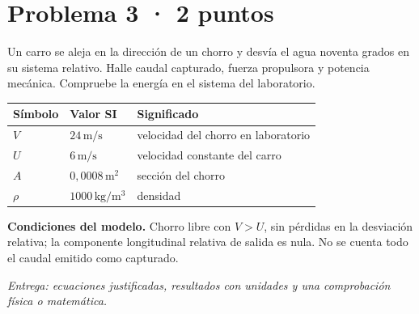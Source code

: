 \par\medskip\noindent\begin{minipage}{\linewidth}

\section{Problema 3 · 2 puntos}

Un carro se aleja en la dirección de un chorro y desvía el agua noventa grados en su sistema relativo. Halle caudal capturado, fuerza propulsora y potencia mecánica. Compruebe la energía en el sistema del laboratorio.

\begin{tabular}{@{}p{.15\linewidth}p{.23\linewidth}p{.54\linewidth}@{}}
\toprule Símbolo & Valor SI & Significado\\\midrule
$V$ & $24\,\mathrm{m/s}$ & velocidad del chorro en laboratorio\\
$U$ & $6\,\mathrm{m/s}$ & velocidad constante del carro\\
$A$ & $0{,}0008\,\mathrm{m^2}$ & sección del chorro\\
$\rho$ & $1000\,\mathrm{kg/m^3}$ & densidad\\
\bottomrule\end{tabular}

\par\medskip\textbf{Condiciones del modelo.} Chorro libre con $V>U$, sin pérdidas en la desviación relativa; la componente longitudinal relativa de salida es nula. No se cuenta todo el caudal emitido como capturado.

\par\textit{Entrega: ecuaciones justificadas, resultados con unidades y una comprobación física o matemática.}

\end{minipage}\par\medskip

